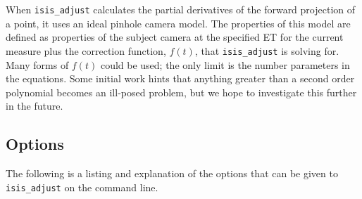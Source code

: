 When \texttt{isis\_adjust} calculates the partial derivatives of the
forward projection of a point, it uses an ideal pinhole camera model.
The properties of this model are defined as properties of the subject
camera at the specified ET for the current measure plus the
correction function, $f(t)$, that \texttt{isis\_adjust} is solving
for.  Many forms of $f(t)$ could be used; the only limit is the
number parameters in the equations. Some initial work hints that
anything greater than a second order polynomial becomes an ill-posed
problem, but we hope to investigate this further in the future.

\begin{center}
\end{center}

\subsection{Options}

The following is a listing and explanation of the options
that can be given to \texttt{isis\_adjust} on the command line.


